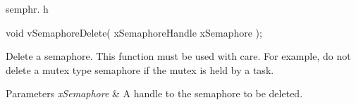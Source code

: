 semphr. h 
\begin{DoxyPre}void vSemaphoreDelete( xSemaphoreHandle xSemaphore );\end{DoxyPre}


Delete a semaphore. This function must be used with care. For example, do not delete a mutex type semaphore if the mutex is held by a task.


\begin{DoxyParams}{Parameters}
{\em x\-Semaphore} & A handle to the semaphore to be deleted. \\
\hline
\end{DoxyParams}
